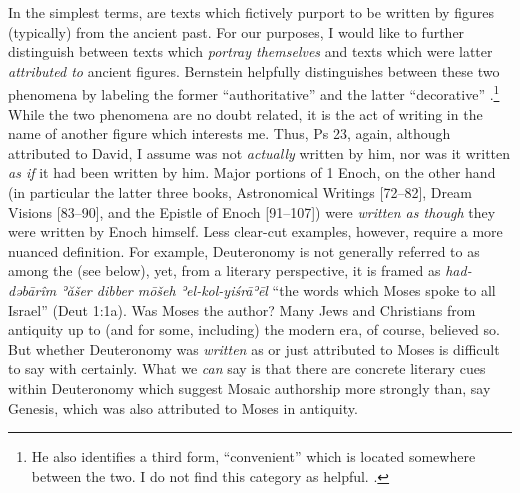  In the simplest terms, \psa are texts which fictively purport to be written by figures (typically) from the ancient past. For our purposes, I would like to further distinguish between texts which \emph{portray themselves} and texts which were latter \emph{attributed to} ancient figures. Bernstein helpfully distinguishes between these two phenomena by labeling the former ``authoritative'' \psy and the latter ``decorative'' \psy.\footnote{He also identifies a third form, ``convenient'' \psy which is located somewhere between the two. I do not find this category as helpful. \autocite[3--7]{bernstein_chazon-etal1999}.} While the two phenomena are no doubt related, it is the act of writing in the name of another figure which interests me. Thus, Ps 23, again, although attributed to David, I assume was not \emph{actually} written by him, nor was it written \emph{as if} it had been written by him. Major portions of 1 Enoch, on the other hand (in particular the latter three books, Astronomical Writings [72--82], Dream Visions [83--90], and the Epistle of Enoch [91--107]) were \emph{written as though} they were written by Enoch himself. Less clear-cut examples, however, require a more nuanced definition. For example, Deuteronomy is not generally referred to as among the \psa (see below), yet, from a literary perspective, it is framed as \emph{had-dəbārîm ʾăšer dibber mōšeh ʾel-kol-yiśrāʾēl} ``the words which Moses spoke to all Israel'' (Deut 1:1a). Was Moses the author? Many Jews and Christians from antiquity up to (and for some, including) the modern era, of course, believed so. But whether Deuteronomy was \emph{written} as \psa or just attributed to Moses is difficult to say with certainly. What we \emph{can} say is that there are concrete literary cues within Deuteronomy which suggest Mosaic authorship more strongly than, say Genesis, which was also attributed to Moses in antiquity.

